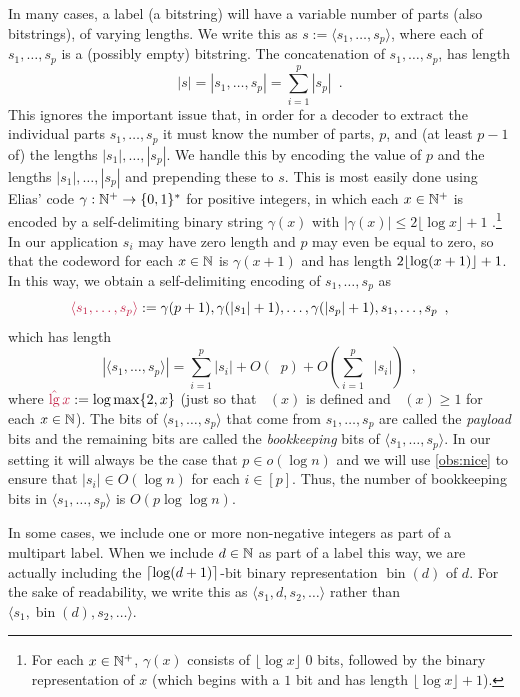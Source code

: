 \documentclass{patmorin}
\makeatletter
\renewcommand{\ge}{\geqslant}
\renewcommand{\le}{\leqslant}
\newcommand{\defin}[1]{\emph{\textcolor{brightmaroon}{#1}}}
\def\mathcolor#1#{\@mathcolor{#1}}
\def\@mathcolor#1#2#3{%
  \protect\leavevmode
  \begingroup
    \color#1{#2}#3%
  \endgroup
}
\newcommand{\mathdefin}[1]{\mathcolor{brightmaroon}{#1}}
\DeclareMathOperator{\lgg}{\hat{lg}}
\DeclareMathOperator{\bin}{bin}
\newcommand{\Oh}{O}
\DeclarePairedDelimiter{\ceil}{\lceil}{\rceil}
\makeatother
\begin{document}
In many cases, a label (a bitstring) will have a variable number of parts (also bitstrings), of varying lengths.  We write this as $s:=\langle s_1,\ldots,s_p\rangle$, where each of $s_1,\ldots,s_p$ is a (possibly empty) bitstring.  The concatenation of $s_1,\ldots,s_p$, has length
\[
  \textstyle |s|=|s_1,\ldots,s_p|=\sum_{i=1}^p|s_p| \enspace .
\]
This ignores the important issue that, in order for a decoder to extract the individual parts $s_1,\ldots,s_p$ it must know the number of parts, $p$, and (at least $p-1$ of) the lengths $|s_1|,\ldots,|s_p|$.  We handle this by encoding the value of $p$ and the lengths $|s_1|,\ldots,|s_{p}|$ and prepending these to $s$. This is most easily done using Elias' code $\gamma:\mathbb{N}^+\to\{0,1\}^*$ for positive integers, in which each $x\in\mathbb{N}^+$ is encoded by a self-delimiting binary string $\gamma(x)$ with $|\gamma(x)|\le 2\lfloor \log x  \rfloor  + 1$ \cite{elias:universal}.\footnote{For each $x\in\mathbb{N}^+$, $\gamma(x)$ consists of $\lfloor\log x\rfloor$ 0 bits, followed by the binary representation of $x$ (which begins with a $1$ bit and has length $\lfloor\log x\rfloor+1$).} In our application $s_i$ may have zero length and $p$ may even be equal to zero, so that the codeword for each $x\in\mathbb{N}$ is $\gamma(x+1)$ and has length $2{\lfloor \log (x+1) \rfloor}+1$.
In this way, we obtain a self-delimiting encoding of $s_1,\ldots,s_p$ as
\[  \mathdefin{\langle s_1,\ldots,s_p\rangle}:=\gamma(p+1),\gamma(|s_1|+1),\ldots,\gamma(|s_p|+1),s_1,\ldots,s_p \enspace ,
\]
which has length
\begin{equation}
  |\langle s_1,\ldots,s_p\rangle| = \textstyle\sum_{i=1}^p|s_i|+\Oh(\lgg p) + \Oh(\sum_{i=1}^p\lgg|s_i|) \enspace , \label{encoding_cost}
\end{equation}
where $\mathdefin{\lgg x} := \log\max\{2,x\}$ (just so that $\lgg(x)$ is defined and $\lgg(x)\ge 1$ for each $x\in\mathbb{N}$).    The bits of $\langle s_1,\ldots,s_p\rangle$ that come from $s_1,\ldots,s_p$ are called the \defin{payload} bits and the remaining bits are called the \defin{bookkeeping} bits of $\langle s_1,\ldots,s_p\rangle$.
In our setting it will always be the case that $p\in o(\log n)$ and we will use \cref{obs:nice} to ensure that $|s_i|\in \Oh(\log n)$ for each $i\in[p]$.
Thus, the number of bookkeeping bits in $\langle s_1,\ldots,s_p\rangle$  is $\Oh(p\log\log n)$.

In some cases, we include one or more non-negative integers as part of a multipart label.  When we include $d\in\mathbb{N}$ as part of a label this way, we are actually including the $\ceil{\log(d+1)}$-bit binary representation \defin{$\bin(d)$} of $d$.  For the sake of readability, we write this as $\langle s_1,d,s_2,\ldots\rangle$ rather than $\langle s_1,\bin(d),s_2,\ldots\rangle$. \label{bin_d}
\end{document}
